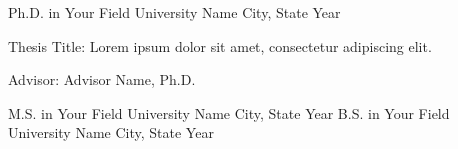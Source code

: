 \begin{cventries}
  \cventry
    {Ph.D. in Your Field}
    {University Name}
    {City, State}
    {Year}
    {
      \begin{cvitems}
        \item {Thesis Title: Lorem ipsum dolor sit amet, consectetur adipiscing elit.}
        \item {Advisor: Advisor Name, Ph.D.}
      \end{cvitems}
    }
  \cventry
    {M.S. in Your Field}
    {University Name}
    {City, State}
    {Year}
    {}
  \cventry
    {B.S. in Your Field}
    {University Name}
    {City, State}
    {Year}
    {}
\end{cventries}
